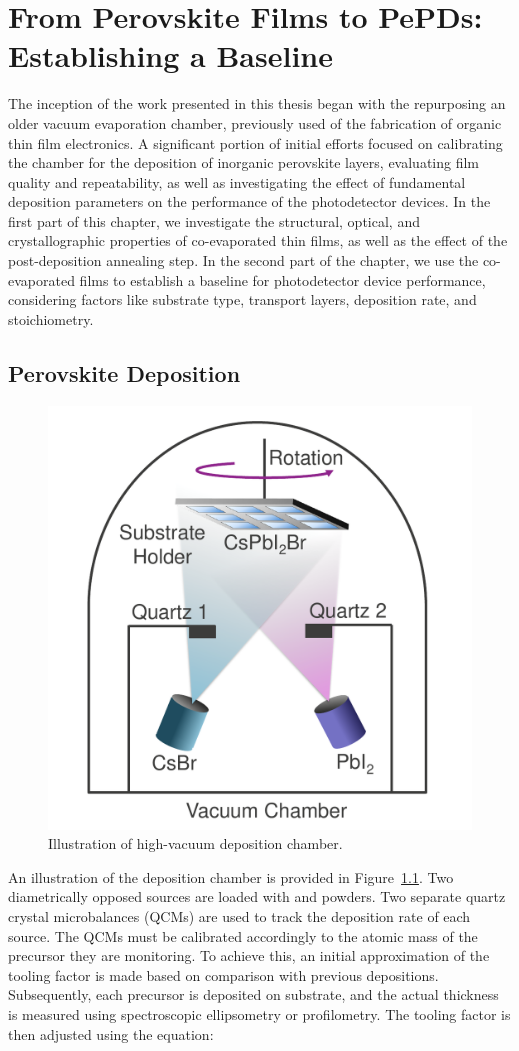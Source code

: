 \chapter{From Perovskite Films to PePDs: Establishing a Baseline}\label{ch:material_properties}

The inception of the work presented in this thesis began with the repurposing an older vacuum evaporation chamber, previously used of the fabrication of organic thin film electronics. A significant portion of initial efforts focused on calibrating the chamber for the deposition of inorganic perovskite layers, evaluating film quality and repeatability, as well as investigating the effect of fundamental deposition parameters on the performance of the photodetector devices. In the first part of this chapter, we investigate the structural, optical, and crystallographic properties of co-evaporated  thin films, as well as the effect of the post-deposition annealing step. In the second part of the chapter, we use the co-evaporated films to establish a baseline for photodetector device performance, considering factors like substrate type, transport layers, deposition rate, and stoichiometry. 

\section{Perovskite Deposition}

\begin{figure}
  \centering
  \medskip
  \includegraphics[width=.5\textwidth]{chapters/material_properties/images/Chamber.pdf}
  \caption[Short caption for Table of Figures]{Illustration of high-vacuum deposition chamber.}
  \label{fig:deposition_chamber}
\end{figure}




An illustration of the deposition chamber is provided in Figure~\ref{fig:deposition_chamber}. Two diametrically opposed sources are loaded with  and  powders. Two separate quartz crystal microbalances (QCMs) are used to track the deposition rate of each source. The QCMs must be calibrated accordingly to the atomic mass of the precursor they are monitoring. To achieve this, an initial approximation of the tooling factor is made based on comparison with previous depositions. Subsequently, each precursor is deposited on  substrate, and the actual thickness is measured using spectroscopic ellipsometry or profilometry. The tooling factor is then adjusted using the equation: 

